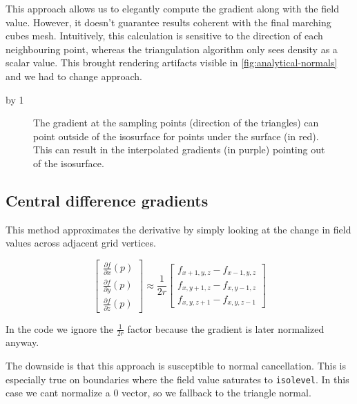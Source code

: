 \documentclass[a4paper]{report}
\begin{document}
This approach allows us to elegantly compute the gradient along with the field value. However, it doesn't guarantee results coherent with the final marching cubes mesh. Intuitively, this calculation is sensitive to the direction of each neighbouring point, whereas the triangulation algorithm only sees density as a scalar value. This brought rendering artifacts visible in \cref{fig:analytical-normals} and we had to change approach.

\clearpage
\advance\voffset by 1\baselineskip 
\addtolength{\footskip}{-1\baselineskip}

\begin{figure}[htbp]
  \centering
  
  \caption{The gradient at the sampling points (direction of the triangles) can point outside of the isosurface for points under the surface (in red). This can result in the interpolated gradients (in purple) pointing out of the isosurface.}
  \label{fig:gradient-flipping}
\end{figure}

\subsection{Central difference gradients}

This method approximates the derivative by simply looking at the change in field values across adjacent grid vertices.

\begin{equation}
\begin{bmatrix}
\frac{\partial f}{\partial x}(p)\\[1ex]
\frac{\partial f}{\partial y}(p)\\[1ex]
\frac{\partial f}{\partial z}(p)
\end{bmatrix}
\approx
\frac 1{2r}
\begin{bmatrix}
f_{x+1,y,z}-f_{x-1,y,z}\\
f_{x,y+1,z}-f_{x,y-1,z}\\
f_{x,y,z+1}-f_{x,y,z-1}
\end{bmatrix}
\end{equation}

In the code we ignore the $\frac 1{2r}$ factor because the gradient is later normalized anyway.

The downside is that this approach is susceptible to normal cancellation. This is especially true on boundaries where the field value saturates to \lstinline{isolevel}. In this case we cant normalize a 0 vector, so we fallback to the triangle normal.
\end{document}

